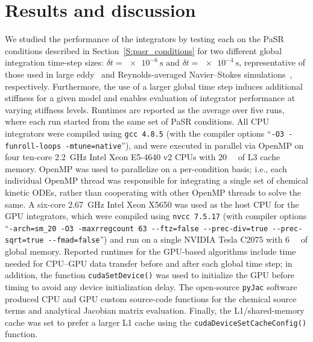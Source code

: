 \documentclass[preprint]{elsarticle}
\begin{document}
\section{Results and discussion}
\label{S:results}

We studied the performance of the integrators by testing each on the PaSR conditions described in Section~\ref{S:pasr_conditions} for two different global integration time-step sizes: $\delta t = \SI{e-6}{\s}$ and $\delta t = \SI{e-4}{\s}$, representative of those used in large eddy~\cite{Wang20111319,Bulat20133155} and Reynolds-averaged Navier--Stokes simulations~\cite{Ramirez2010}, respectively.
Furthermore, the use of a larger global time step induces additional stiffness for a given model and enables evaluation of integrator performance at varying stiffness levels.
Runtimes are reported as the average over five runs, where each run started from the same set of PaSR conditions.
All CPU integrators were compiled using \texttt{gcc 4.8.5} (with the compiler options ``\texttt{-O3 -funroll-loops -mtune=native}''), and were executed in parallel via OpenMP on four ten-core \SI{2.2}{\giga\hertz} Intel Xeon E5-4640 v2 CPUs with \SI{20}{\mega\byte} of L3 cache memory.
OpenMP was used to parallelize on a per-condition basis; i.e., each individual OpenMP thread was responsible for integrating a single set of chemical kinetic ODEs, rather than cooperating with other OpenMP threads to solve the same.
A six-core \SI{2.67}{\giga\hertz} Intel Xeon X5650 was used as the host CPU for the GPU integrators, which were compiled using \texttt{nvcc 7.5.17} (with compiler options ``\texttt{-arch=sm\_20 -O3 -maxrregcount 63 -{}-ftz=false -{}-prec-div=true -{}-prec-sqrt=true -{}-fmad=false}'') and run on a single NVIDIA Tesla C2075 with \SI{6}{\giga\byte} of global memory.
Reported runtimes for the GPU-based algorithms include time needed for CPU--GPU data transfer before and after each global time step; in addition, the function \texttt{cudaSetDevice()} was used to initialize the GPU before timing to avoid any device initialization delay.
The open-source \texttt{pyJac} software~\cite{niemeyer_2016_51139,Niemeyer:2015ws,Niemeyer:2016aa} produced CPU and GPU custom source-code functions for the chemical source terms and analytical Jacobian matrix evaluation.
Finally, the L1\slash shared-memory cache was set to prefer a larger L1 cache using the \texttt{cudaDeviceSetCacheConfig()} function.
\end{document}
